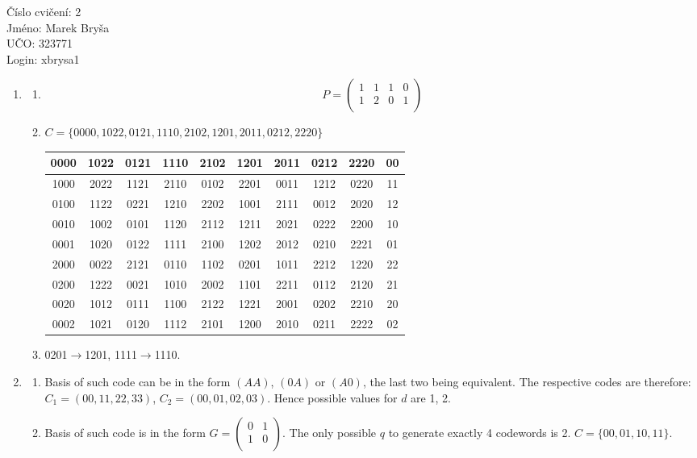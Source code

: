 \documentclass[a4paper,9pt]{extarticle}
\begin{document}
\begin{flushleft}
Číslo cvičení: 2 \\ 
Jméno: Marek Bryša \\
UČO: 323771\\
Login: xbrysa1\\
\end{flushleft}
\begin{enumerate}
  \item
    \begin{enumerate}
      \item
        \[
          P=\begin{pmatrix}
            1 & 1 & 1 & 0 \\
            1 & 2 & 0 & 1 \\
          \end{pmatrix}
        \]
      \item
        $C=\{0000,1022,0121,1110,2102,1201,2011,0212,2220\}$
        \begin{center}
          \begin{tabular}{|c|c|c|c|c|c|c|c|c||c|}
            \hline
            0000	&1022	&0121	&1110	&2102	&1201	&2011	&0212	&2220	&00\\
            \hline
            1000	&2022	&1121	&2110	&0102	&2201	&0011	&1212	&0220	&11\\
            0100	&1122	&0221	&1210	&2202	&1001	&2111	&0012	&2020	&12\\
            0010	&1002	&0101	&1120	&2112	&1211	&2021	&0222	&2200	&10\\
            0001	&1020	&0122	&1111	&2100	&1202	&2012	&0210	&2221	&01\\
            2000	&0022	&2121	&0110	&1102	&0201	&1011	&2212	&1220	&22\\
            0200	&1222	&0021	&1010	&2002	&1101	&2211	&0112	&2120	&21\\
            0020	&1012	&0111	&1100	&2122	&1221	&2001	&0202	&2210	&20\\
            0002	&1021	&0120	&1112	&2101	&1200	&2010	&0211	&2222	&02\\
            \hline
          \end{tabular}
        \end{center}
      \item
        0201$\rightarrow$1201, 1111$\rightarrow$1110.

    \end{enumerate}
  \item
    \begin{enumerate}
      \item
        Basis of such code can be in the form $(AA)$, $(0A)$ or $(A0)$, the last two being equivalent. The respective codes are therefore: $C_1=(00,11,22,33)$, $C_2=(00,01,02,03)$. Hence possible values for $d$ are 1, 2.
      \item
        Basis of such code is in the form $G=\begin{pmatrix}
            0 & 1 \\
            1 & 0 \\
          \end{pmatrix}$. The only possible $q$ to generate exactly 4 codewords is 2. $C=\{00,01,10,11\}$.


\end{enumerate}
\end{enumerate}
\end{document}

